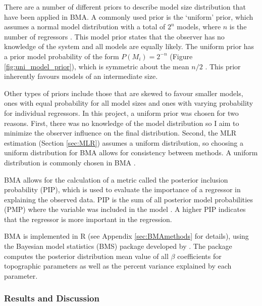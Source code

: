 \documentclass{sfuthesis}
\begin{document}
{There are a number of different priors to describe model size distribution that have been applied in BMA. A commonly used prior is the `uniform' prior, which assumes a normal model distribution with a total of $2^n$ models, where $n$ is the number of regressors \citep{Wasserman2000}.  This model prior states that the observer has no knowledge of the system and all models are equally likely. The uniform prior has a prior model probability of the form $P(M_i)=2^{-n}$ (Figure \ref{fig:uni_model_prior}), which is symmetric about the mean $n/2$ \citep{Zeugner2015}. This prior inherently favours models of an intermediate size. 

Other types of priors include those that are skewed to favour smaller models, ones with equal probability for all model sizes and ones with varying probability for individual regressors. In this project, a uniform prior was chosen for two reasons. First, there was no knowledge of the model distribution so I aim to minimize the observer influence on the final distribution. Second, the MLR estimation (Section \ref{sec:MLR}) assumes a uniform distribution, so choosing a uniform distribution for BMA allows for consistency between methods. A uniform distribution is commonly chosen in BMA \citep{Wasserman2000}.

BMA allows for the calculation of a metric called the posterior inclusion probability (PIP), which is used to evaluate the importance of a regressor in explaining the observed data. PIP is the sum of all posterior model probabilities (PMP) where the variable was included in the model \citep{Zeugner2015}. A higher PIP indicates that the regressor is more important in the regression.  

BMA is implemented in R (see Appendix \ref{sec:BMAmethods} for details), using the Bayesian model statistics (BMS) package developed by \cite{Zeugner2015}. The package computes the posterior distribution mean value of all $\beta$ coefficients for topographic parameters as well as the percent variance explained by each parameter.

\subsubsection{Results and Discussion}

}
\end{document}
